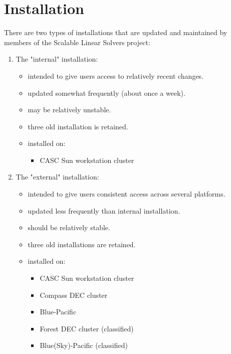 \chapter{Installation}
\label{Installation}

There are two types of \hypre{} installations that are updated and
maintained by members of the Scalable Linear Solvers project:
\begin{enumerate}

\item The "internal" installation:
   \begin{itemize}
   \item intended to give users access to relatively recent changes.
   \item updated somewhat frequently (about once a week).
   \item may be relatively unstable.
   \item three old installation is retained.
   \item installed on:
      \begin{itemize}
      \item CASC Sun workstation cluster
      \end{itemize}
   \end{itemize}

\item The "external" installation:
   \begin{itemize}
   \item intended to give users consistent access across several platforms.
   \item updated less frequently than internal installation.
   \item should be relatively stable.
   \item three old installations are retained.
   \item installed on:
      \begin{itemize}
       \item CASC Sun workstation cluster
       \item Compass DEC cluster
       \item Blue-Pacific
       \item Forest DEC cluster  (classified)
       \item Blue(Sky)-Pacific   (classified)
      \end{itemize}
   \end{itemize}

\end{enumerate}

